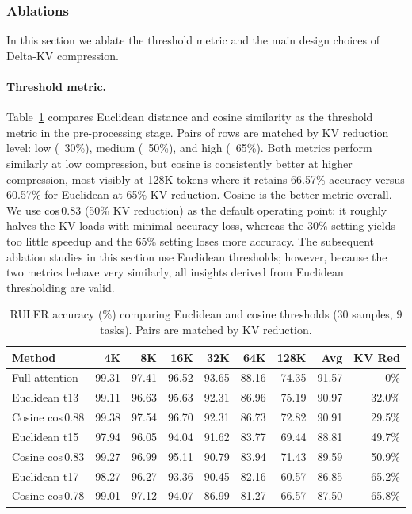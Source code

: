 \subsubsection{Ablations}

In this section we ablate the threshold metric and the main design choices of Delta-KV compression.

\paragraph{Threshold metric.}
\label{sec:ablation_threshold}

Table~\ref{tab:ablation_threshold} compares Euclidean distance and cosine similarity as the threshold metric in the pre-processing stage. Pairs of rows are matched by KV reduction level: low (~30\%), medium (~50\%), and high (~65\%). Both metrics perform similarly at low compression, but cosine is consistently better at higher compression, most visibly at 128K tokens where it retains 66.57\% accuracy versus 60.57\% for Euclidean at 65\% KV reduction. Cosine is the better metric overall. We use cos\,0.83 (50\% KV reduction) as the default operating point: it roughly halves the KV loads with minimal accuracy loss, whereas the 30\% setting yields too little speedup and the 65\% setting loses more accuracy. The subsequent ablation studies in this section use Euclidean thresholds; however, because the two metrics behave very similarly, all insights derived from Euclidean thresholding are valid.

\begin{table}[!ht]
\centering
\caption{RULER accuracy (\%) comparing Euclidean and cosine thresholds (30 samples, 9 tasks). Pairs are matched by KV reduction.}
\label{tab:ablation_threshold}
\begin{tabular}{lrrrrrrrr}
\toprule
Method & 4K & 8K & 16K & 32K & 64K & 128K & Avg & KV Red \\
\midrule
Full attention              & 99.31 & 97.41 & 96.52 & 93.65 & 88.16 & 74.35 & 91.57 & 0\%    \\
\midrule
Euclidean t13               & 99.11 & 96.63 & 95.63 & 92.31 & 86.96 & 75.19 & 90.97 & 32.0\% \\
Cosine cos\,0.88               & 99.38 & 97.54 & 96.70 & 92.31 & 86.73 & 72.82 & 90.91 & 29.5\% \\
\midrule
Euclidean t15               & 97.94 & 96.05 & 94.04 & 91.62 & 83.77 & 69.44 & 88.81 & 49.7\% \\
Cosine cos\,0.83               & 99.27 & 96.99 & 95.11 & 90.79 & 83.94 & 71.43 & 89.59 & 50.9\% \\
\midrule
Euclidean t17               & 98.27 & 96.27 & 93.36 & 90.45 & 82.16 & 60.57 & 86.85 & 65.2\% \\
Cosine cos\,0.78               & 99.01 & 97.12 & 94.07 & 86.99 & 81.27 & 66.57 & 87.50 & 65.8\% \\
\bottomrule
\end{tabular}
\end{table}

